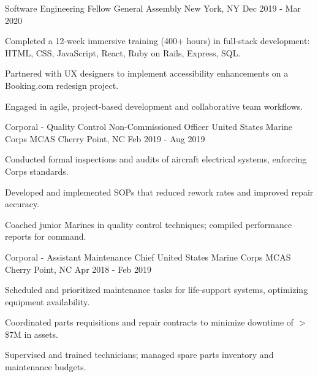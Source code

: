 \begin{cventries}
  \cventry
    {Software Engineering Fellow} %
    {General Assembly} %
    {New York, NY} %
    {Dec 2019 - Mar 2020} %
    {
      \begin{cvitems}
        \item {Completed a 12-week immersive training (400+ hours) in full-stack development: HTML, CSS, JavaScript, React, Ruby on Rails, Express, SQL.}
        \item {Partnered with UX designers to implement accessibility enhancements on a Booking.com redesign project.}
        \item {Engaged in agile, project-based development and collaborative team workflows.}
      \end{cvitems}
    }

  \cventry
    {Corporal - Quality Control Non-Commissioned Officer} %
    {United States Marine Corps} %
    {MCAS Cherry Point, NC} %
    {Feb 2019 - Aug 2019} %
    {
      \begin{cvitems}
        \item {Conducted formal inspections and audits of aircraft electrical systems, enforcing Corps standards.}
        \item {Developed and implemented SOPs that reduced rework rates and improved repair accuracy.}
        \item {Coached junior Marines in quality control techniques; compiled performance reports for command.}
      \end{cvitems}
    }

  \cventry
    {Corporal - Assistant Maintenance Chief} %
    {United States Marine Corps} %
    {MCAS Cherry Point, NC} %
    {Apr 2018 - Feb 2019} %
    {
      \begin{cvitems}
        \item {Scheduled and prioritized maintenance tasks for life-support systems, optimizing equipment availability.}
        \item {Coordinated parts requisitions and repair contracts to minimize downtime of $>$\$7M in assets.}
        \item {Supervised and trained technicians; managed spare parts inventory and maintenance budgets.}
      \end{cvitems}
    }


\end{cventries}
